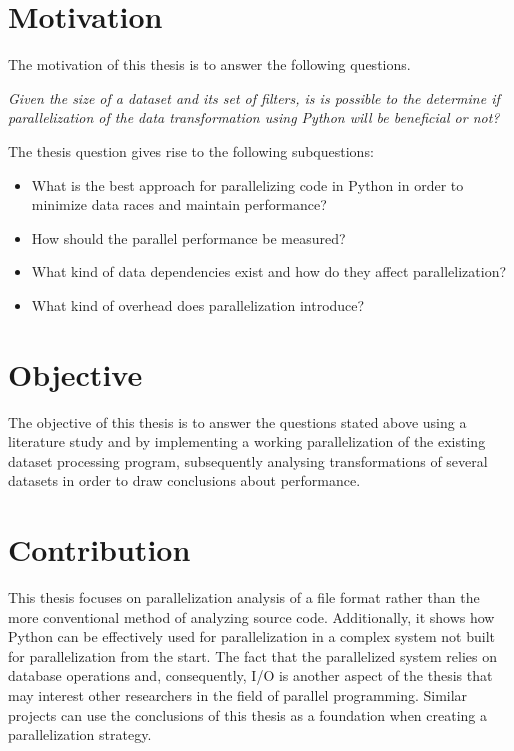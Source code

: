 \section{Motivation}
The motivation of this thesis is to answer the following questions.

\emph{Given the size of a dataset and its set of filters, is is possible to the determine 
if parallelization of the data transformation using Python will be beneficial or not?}

The thesis question gives rise to the following subquestions:
\begin{itemize}
    \item What is the best approach for parallelizing code in Python in order to minimize data races and maintain performance?
    \item How should the parallel performance be measured?
    \item What kind of data dependencies exist and how do they affect parallelization?
    \item What kind of overhead does parallelization introduce?
\end{itemize}

\section{Objective}
The objective of this thesis is to answer the questions stated above using a literature study and by implementing a working parallelization
of the existing dataset processing program, subsequently analysing transformations of several datasets in order to draw conclusions about performance.

\section{Contribution}
This thesis focuses on parallelization analysis of a file format rather than the more conventional method of analyzing source code. Additionally,
it shows how Python can be effectively used for parallelization in a complex system not built for parallelization from the start. The fact that
the parallelized system relies on database operations and, consequently, I/O is another aspect of the thesis that may interest other researchers
in the field of parallel programming. Similar projects can use the conclusions of this thesis as a foundation when creating a parallelization strategy.
